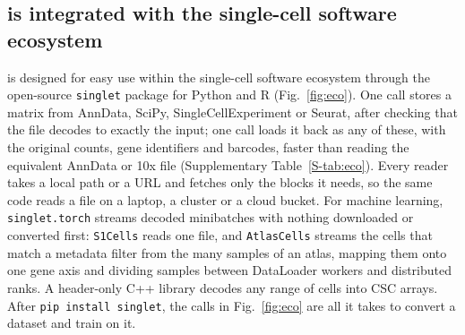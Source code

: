 \subsection{\sone{} is integrated with the single-cell software ecosystem}

\sone{} is designed for easy use within the single-cell software ecosystem through the open-source \texttt{singlet}
package for Python and R (Fig.~\ref{fig:eco}). One call stores a matrix from AnnData, SciPy, SingleCellExperiment or Seurat, after
checking that the file decodes to exactly the input; one call loads it back as any of these, with the original counts,
gene identifiers and barcodes, faster than reading the equivalent AnnData or 10x file (Supplementary
Table~\ref{S-tab:eco}). Every reader takes a local path or a URL and fetches only the blocks it needs, so the same code
reads a file on a laptop, a cluster or a cloud bucket. For machine learning, \texttt{singlet.torch} streams decoded
minibatches with nothing downloaded or converted first: \texttt{S1Cells} reads one file, and \texttt{AtlasCells} streams the
cells that match a metadata filter from the many samples of an atlas, mapping them onto one gene axis and dividing samples
between DataLoader workers and distributed ranks. A header-only C++ library decodes any range of cells into CSC arrays.
After \texttt{pip install singlet}, the calls in Fig.~\ref{fig:eco} are all it takes to convert a dataset and train on it.


